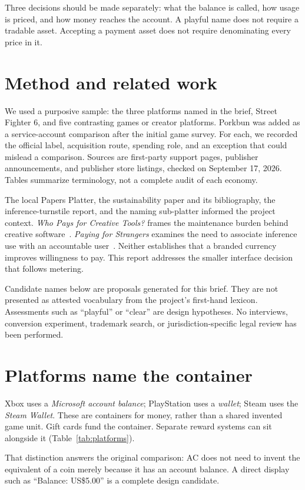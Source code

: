 \documentclass[10pt,letterpaper,twocolumn]{article}
\begin{document}
Three decisions should be made separately: what the balance is called, how usage is priced, and how money reaches the account. A playful name does not require a tradable asset. Accepting a payment asset does not require denominating every price in it.

\section{Method and related work}
We used a purposive sample: the three platforms named in the brief, Street Fighter 6, and five contrasting games or creator platforms. Porkbun was added as a service-account comparison after the initial game survey. For each, we recorded the official label, acquisition route, spending role, and an exception that could mislead a comparison. Sources are first-party support pages, publisher announcements, and publisher store listings, checked on September 17, 2026. Tables summarize terminology, not a complete audit of each economy.

The local Papers Platter, the sustainability paper and its bibliography, the inference-turnstile report, and the naming sub-platter informed the project context. \emph{Who Pays for Creative Tools?} frames the maintenance burden behind creative software~\cite{sustainability}. \emph{Paying for Strangers} examines the need to associate inference use with an accountable user~\cite{turnstile}. Neither establishes that a branded currency improves willingness to pay. This report addresses the smaller interface decision that follows metering.

Candidate names below are proposals generated for this brief. They are not presented as attested vocabulary from the project's first-hand lexicon. Assessments such as ``playful'' or ``clear'' are design hypotheses. No interviews, conversion experiment, trademark search, or jurisdiction-specific legal review has been performed.

\section{Platforms name the container}
Xbox uses a \emph{Microsoft account balance}; PlayStation uses a \emph{wallet}; Steam uses the \emph{Steam Wallet}. These are containers for money, rather than a shared invented game unit. Gift cards fund the container. Separate reward systems can sit alongside it (Table~\ref{tab:platforms}).

That distinction answers the original comparison: AC does not need to invent the equivalent of a coin merely because it has an account balance. A direct display such as ``Balance: US\$5.00'' is a complete design candidate.
\end{document}
